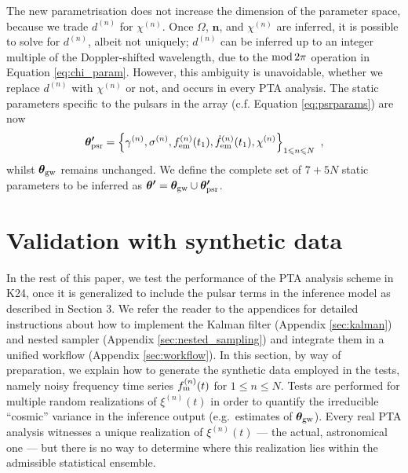 \documentclass[fleqn,usenatbib,useAMS]{mnras}
\begin{document}
The new parametrisation does not increase the dimension of the parameter space, because we trade $d^{(n)}$ for $\chi^{(n)}$. Once $\Omega$, ${\boldsymbol{n}}$, and $\chi^{(n)}$ are inferred, it is possible to solve for $d^{(n)}$, albeit not uniquely; $d^{(n)}$ can be inferred up to an integer multiple of the Doppler-shifted wavelength, due to the ${\rm mod} \, 2 \pi$ operation in Equation \eqref{eq:chi_param}. However, this ambiguity is unavoidable, whether we replace $d^{(n)}$ with $\chi^{(n)}$ or not, and occurs in every PTA analysis. The static parameters specific to the pulsars in the array (c.f. Equation \eqref{eq:psrparams}) are now
\begin{equation}
	\boldsymbol{\theta'}_{\rm psr} = \left \{ \gamma^{(n)},\sigma^{(n)}, f_{\rm em}^{(n)}(t_1),\dot{f}_{\rm em}^{(n)}(t_1),\chi^{(n)} \right\}_{1\leq n \leq N} \ ,  \label{eq:psrparamsnew}
\end{equation}
whilst $\boldsymbol{\theta}_{\rm gw}$  remains unchanged. We define the complete set of $7 +5N$ static parameters to be inferred as $\boldsymbol{\theta'} = \boldsymbol{\theta}_{\rm gw} \cup \boldsymbol{\theta'}_{\rm psr}$.  


\section{Validation with synthetic data}\label{sec:rep_example1}
In the rest of this paper, we test the performance of the PTA analysis scheme in K24, once it is generalized to include the pulsar terms in the inference model as described in Section 3. We refer the reader to the appendices for detailed instructions about how to implement the Kalman filter (Appendix \ref{sec:kalman}) and nested sampler (Appendix \ref{sec:nested_sampling}) and integrate them in a unified workflow (Appendix \ref{sec:workflow}). In this section, by way of preparation, we explain how to generate the synthetic data employed in the tests, namely noisy frequency time series $f_{\rm m}^{(n)}(t)$ for $1 \leq n \leq N$. Tests are performed for multiple random realizations of $\xi^{(n)}(t)$ in order to quantify the irreducible ``cosmic'' variance in the inference output (e.g.\ estimates of ${\boldsymbol{\theta}}_{\rm gw}$). Every real PTA analysis witnesses a unique realization of $\xi^{(n)}(t)$ --- the actual, astronomical one --- but there is no way to determine where this realization lies within the admissible statistical ensemble. \newline 
\end{document}
